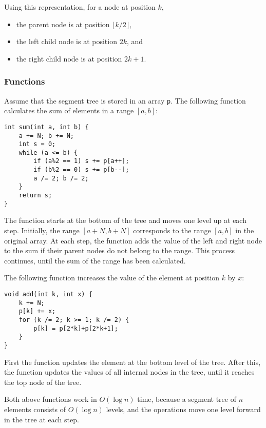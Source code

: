 Using this representation,
for a node at position $k$,
\begin{itemize}
\item the parent node is at position $\lfloor k/2 \rfloor$,
\item the left child node is at position $2k$, and
\item the right child node is at position $2k+1$.
\end{itemize}

\subsubsection{Functions}

Assume that the segment tree is stored
in an array \texttt{p}.
The following function
calculates the sum of elements in a range $[a,b]$:

\begin{lstlisting}
int sum(int a, int b) {
    a += N; b += N;
    int s = 0;
    while (a <= b) {
        if (a%2 == 1) s += p[a++];
        if (b%2 == 0) s += p[b--];
        a /= 2; b /= 2;
    }
    return s;
}
\end{lstlisting}

The function starts at the bottom of the tree
and moves one level up at each step.
Initially, the range $[a+N,b+N]$ corresponds
to the range $[a,b]$ in the original array.
At each step, the function adds the value of
the left and right node to the sum
if their parent nodes do not belong to the range.
This process continues, until the sum of the
range has been calculated.

The following function increases the value
of the element at position $k$ by $x$:

\begin{lstlisting}
void add(int k, int x) {
    k += N;
    p[k] += x;
    for (k /= 2; k >= 1; k /= 2) {
        p[k] = p[2*k]+p[2*k+1];
    }
}
\end{lstlisting}
First the function updates the element
at the bottom level of the tree.
After this, the function updates the values of all
internal nodes in the tree, until it reaches
the top node of the tree.

Both above functions work
in $O(\log n)$ time, because a segment tree
of $n$ elements consists of $O(\log n)$ levels,
and the operations move one level forward in the tree at each step.


